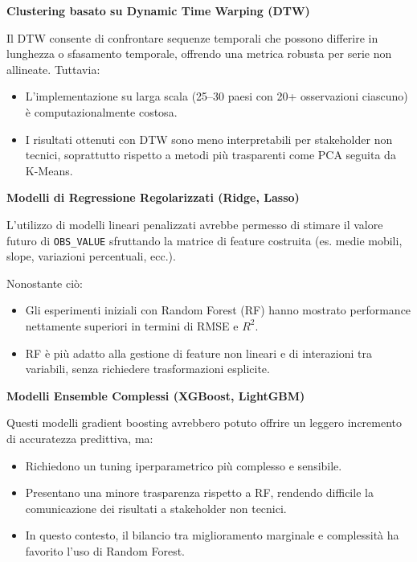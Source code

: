 \documentclass[conference]{IEEEtran}
\begin{document}
\vspace{1em}\noindent\textbf{Clustering basato su Dynamic Time Warping (DTW)}

Il DTW consente di confrontare sequenze temporali che possono differire in lunghezza o sfasamento temporale, offrendo una metrica robusta per serie non allineate. Tuttavia:

\begin{itemize}
    \item L’implementazione su larga scala (25–30 paesi con 20+ osservazioni ciascuno) è computazionalmente costosa.
    \item I risultati ottenuti con DTW sono meno interpretabili per stakeholder non tecnici, soprattutto rispetto a metodi più trasparenti come PCA seguita da K-Means.
\end{itemize}

\vspace{1em}\noindent\textbf{Modelli di Regressione Regolarizzati (Ridge, Lasso)}

L’utilizzo di modelli lineari penalizzati avrebbe permesso di stimare il valore futuro di \texttt{OBS\_VALUE} sfruttando la matrice di feature costruita (es. medie mobili, slope, variazioni percentuali, ecc.).

Nonostante ciò:
\begin{itemize}
    \item Gli esperimenti iniziali con Random Forest (RF) hanno mostrato performance nettamente superiori in termini di RMSE e $R^2$.
    \item RF è più adatto alla gestione di feature non lineari e di interazioni tra variabili, senza richiedere trasformazioni esplicite.
\end{itemize}

\vspace{1em}\noindent\textbf{Modelli Ensemble Complessi (XGBoost, LightGBM)}

Questi modelli gradient boosting avrebbero potuto offrire un leggero incremento di accuratezza predittiva, ma:

\begin{itemize}
    \item Richiedono un tuning iperparametrico più complesso e sensibile.
    \item Presentano una minore trasparenza rispetto a RF, rendendo difficile la comunicazione dei risultati a stakeholder non tecnici.
    \item In questo contesto, il bilancio tra miglioramento marginale e complessità ha favorito l’uso di Random Forest.
\end{itemize}
\end{document}

